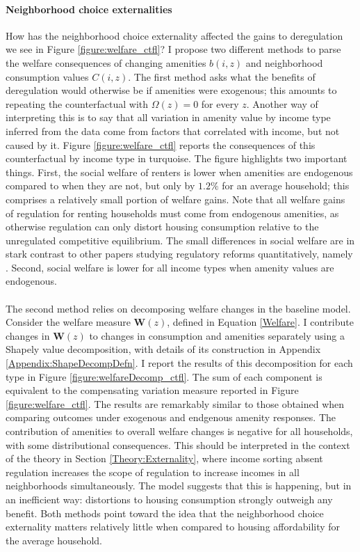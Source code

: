 \documentclass[12pt]{article}
\begin{document}
\paragraph*{Neighborhood choice externalities} 
How has the neighborhood choice externality affected the gains to deregulation we see in Figure \ref{figure:welfare_ctfl}? I propose two different methods to parse the welfare consequences of changing amenities $b(i, z)$ and neighborhood consumption values $C(i, z)$. The first method asks what the benefits of deregulation would otherwise be if amenities were exogenous; this amounts to repeating the counterfactual with $\Omega(z) = 0$ for every $z$. Another way of interpreting this is to say that all variation in amenity value by income type inferred from the data come from factors that correlated with income, but not caused by it. Figure \ref{figure:welfare_ctfl} reports the consequences of this counterfactual by income type in turquoise. The figure highlights two important things. First, the social welfare of renters is lower when amenities are endogenous compared to when they are not, but only by $1.2\%$ for an average household; this comprises a relatively small portion of welfare gains. Note that all welfare gains of regulation for renting households must come from endogenous amenities, as otherwise regulation can only distort housing consumption relative to the unregulated competitive equilibrium. The small differences in social welfare are in stark contrast to other papers studying regulatory reforms quantitatively, namely \cite{calabresetal}. Second, social welfare is lower for all income types when amenity values are endogenous.

\paragraph*{}
The second method relies on decomposing welfare changes in the baseline model. Consider the welfare measure $\boldsymbol{W}(z)$, defined in Equation \eqref{Welfare}. I contribute changes in $\boldsymbol{W}(z)$ to changes in consumption and amenities separately using a Shapely value decomposition, with details of its construction in Appendix \ref{Appendix:ShapeDecompDefn}. I report the results of this decomposition for each type in Figure \ref{figure:welfareDecomp_ctfl}. The sum of each component is equivalent to the compensating variation measure reported in Figure \ref{figure:welfare_ctfl}. The results are remarkably similar to those obtained when comparing outcomes under exogenous and endgenous amenity responses. The contribution of amenities to overall welfare changes is negative for all households, with some distributional consequences. This should be interpreted in the context of the theory in Section \ref{Theory:Externality}, where income sorting absent regulation increases the scope of regulation to increase incomes in all neighborhoods simultaneously. The model suggests that this is happening, but in an inefficient way: distortions to housing consumption strongly outweigh any benefit. Both methods point toward the idea that the neighborhood choice externality matters relatively little when compared to housing affordability for the average household.
\end{document}
